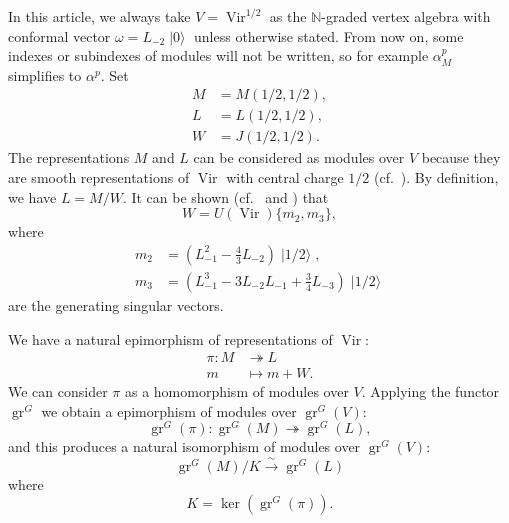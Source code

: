 \documentclass[a4paper, 12pt, reqno]{amsart}
\theoremstyle{remark}
\DeclareMathOperator{\Vir}{Vir}
\DeclareMathOperator{\gr}{gr}
\DeclareMathOperator{\vac}{|0\rangle}
\DeclareMathOperator{\vachalf}{|1/2\rangle}
\begin{document}
In this article, we always take $V = \Vir^{1/2}$ as the $\mathbb{N}$-graded vertex algebra with conformal vector $\omega = L_{-2}\vac$ unless otherwise stated.
From now on, some indexes or subindexes of modules will not be written, so for example $\alpha^p_M$ simplifies to $\alpha^p$.
Set
\begin{align*}
  M &= M(1/2, 1/2), \\
  L &= L(1/2, 1/2), \\
  W &= J(1/2, 1/2).
\end{align*}
The representations $M$ and $L$ can be considered as modules over $V$ because they are smooth representations of $\Vir$ with central charge $1/2$ (cf.\ \cite[Theorem 6.1.7]{lepowsky_introduction_2004}).
By definition, we have $L = M/W$.
It can be shown (cf.\ \cite{feigin_verma_1984} and \cite{astashkevich_structure_1997}) that
\begin{equation}
  \label{eq:5}
  W = U(\Vir)\{m_2, m_3\},
\end{equation}
where
\begin{align*}
  m_2 &= (L_{-1}^2 - \tfrac{4}{3}L_{-2})\vachalf, \\
  m_3 &= (L_{-1}^3 - 3L_{-2}L_{-1} + \tfrac{3}{4}L_{-3})\vachalf
\end{align*}
are the generating singular vectors.

We have a natural epimorphism of representations of $\Vir$:
\begin{align*}
  \pi: M &\twoheadrightarrow L \\
  m &\mapsto m + W.
\end{align*}
We can consider $\pi$ as a homomorphism of modules over $V$.
Applying the functor $\gr^G$ we obtain a epimorphism of modules over $\gr^G(V)$:
\begin{equation*}
  \gr^G(\pi): \gr^G(M) \twoheadrightarrow \gr^G(L),
\end{equation*}
and this produces a natural isomorphism of modules over $\gr^G(V)$:
\begin{equation*}
  \gr^G(M)/K \xrightarrow{\sim} \gr^G(L)
\end{equation*}
where
\begin{equation}
  \label{eq:6}
  K = \ker(\gr^G(\pi)).
\end{equation}
\end{document}
